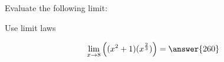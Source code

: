 \documentclass{ximera}
\author{Steven Gubkin}
\begin{document}
\begin{exercise}

		Evaluate the following limit:
	
	\begin{hint}
		Use limit laws
	\end{hint}
	\[
	\lim_{x \to 8} \left( (x^2+1)(x^{\frac{2}{3}}) \right) = \answer{260}
	\]
	
\end{exercise}
\end{document}
